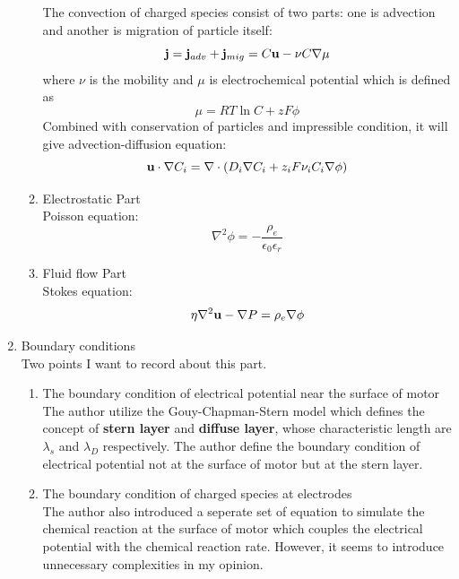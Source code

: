 \documentclass[fontsize=11pt, %
                             paper=a4, %
                             twoside, %
                             captions=tableheading,
                             index=totoc,
                             hyperref]{labbook}
\begin{document}
\begin{addmargin}[4cm]{0cm}
\begin{enumerate}
\begin{enumerate}
The convection of charged species consist of two parts: one is advection and another is migration of particle itself:
\begin{equation}
\mathbf{j}=\mathbf{j}_{adv}+\mathbf{j}_{mig}=C\mathbf{u}-\nu C \nabla \mu
\end{equation}
where $\nu$ is the mobility and $\mu$ is electrochemical potential which is defined as
\begin{equation}
\mu=RT\ln C + z F \phi
\end{equation}
Combined with conservation of particles and impressible condition, it will give advection-diffusion equation:
\begin{equation}
\mathbf{u} \cdot \nabla C_i=\nabla\cdot(D_i \nabla C_i + z_i F \nu_i C_i \nabla \phi)
\end{equation}
\item Electrostatic Part\\
Poisson equation:
\begin{equation}
\nabla^2\phi=-\frac{\rho_e}{\epsilon_0\epsilon_r}
\end{equation}
\item Fluid flow Part\\
Stokes equation:
\begin{equation}
\eta \nabla^2\mathbf{u} -\nabla P=\rho_e \nabla \phi
\end{equation}
\end{enumerate}
\item Boundary conditions\\
Two points I want to record about this part. 
\begin{enumerate}
\item
The boundary condition of electrical potential near the surface of motor\\
The author utilize the Gouy-Chapman-Stern model which defines the concept of \textbf{stern layer} and \textbf{diffuse layer}, whose characteristic length are $\lambda_s$ and $\lambda_D$ respectively. The author define the boundary condition of electrical potential not at the surface of motor but at the stern layer.
\item
The boundary condition of charged species at electrodes\\
The author also introduced a seperate set of equation to simulate the chemical reaction at the surface of motor which couples the electrical potential with the chemical reaction rate. However, it seems to introduce unnecessary complexities in my opinion.
\end{enumerate}
\end{enumerate}

\end{addmargin}
\end{document}
